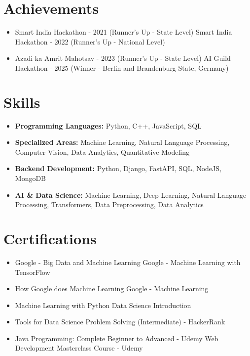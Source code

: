 \documentclass[a4paper,10pt]{article}
\begin{document}
\section*{Achievements}
\begin{itemize}
\item Smart India Hackathon - 2021 (Runner's Up - State Level) \hfill Smart India Hackathon - 2022 (Runner's Up - National Level)
\item Azadi ka Amrit Mahotsav - 2023 (Runner's Up - State Level) \hfill AI Guild Hackathon - 2025 (Winner - Berlin and Brandenburg State, Germany)
\end{itemize}

\section*{Skills}
\begin{itemize}
  \item \textbf{Programming Languages:} Python, C++, JavaScript, SQL
  \item \textbf{Specialized Areas:} Machine Learning, Natural Language Processing, Computer Vision, Data Analytics, Quantitative Modeling
  \item \textbf{Backend Development:} Python, Django, FastAPI, SQL, NodeJS, MongoDB
  \item \textbf{AI \& Data Science:} Machine Learning, Deep Learning, Natural Language Processing, Transformers, Data Preprocessing, Data Analytics
\end{itemize}

\section*{Certifications}
\begin{itemize}
\item Google - Big Data and Machine Learning \hfill Google - Machine Learning with TensorFlow
\item How Google does Machine Learning \hfill Google - Machine Learning
\item Machine Learning with Python \hfill Data Science Introduction
\item Tools for Data Science \hfill Problem Solving (Intermediate) - HackerRank
\item Java Programming: Complete Beginner to Advanced - Udemy \hfill Web Development Masterclass Course - Udemy
\end{itemize}
\end{document}
